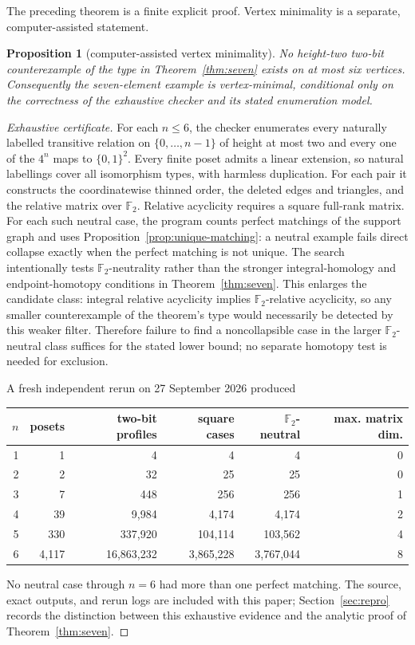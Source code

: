 \documentclass[11pt]{article}
\newtheorem{proposition}[theorem]{Proposition}
\theoremstyle{definition}
\theoremstyle{remark}
\newcommand{\Ftwo}{\mathbb F_2}
\begin{document}
The preceding theorem is a finite explicit proof.  Vertex minimality is a separate,
computer-assisted statement.

\begin{proposition}[computer-assisted vertex minimality]\label{prop:minimality}
No height-two two-bit counterexample of the type in Theorem~\ref{thm:seven} exists on
at most six vertices.  Consequently the seven-element example is vertex-minimal,
conditional only on the correctness of the exhaustive checker and its stated
enumeration model.
\end{proposition}

\begin{proof}[Exhaustive certificate]
For each $n\le6$, the checker enumerates every naturally labelled transitive relation
on $\{0,\ldots,n-1\}$ of height at most two and every one of the $4^n$ maps to
$\{0,1\}^2$.  Every finite poset admits a linear extension, so natural labellings cover
all isomorphism types, with harmless duplication.  For each pair it constructs the
coordinatewise thinned order, the deleted edges and triangles, and the relative
matrix over $\Ftwo$.  Relative acyclicity requires a square full-rank matrix.  For each
such neutral case, the program counts perfect matchings of the support graph and uses
Proposition~\ref{prop:unique-matching}: a neutral example fails direct collapse exactly
when the perfect matching is not unique.  The search intentionally tests
$\Ftwo$-neutrality rather than the stronger integral-homology and endpoint-homotopy
conditions in Theorem~\ref{thm:seven}.  This enlarges the candidate class: integral
relative acyclicity implies $\Ftwo$-relative acyclicity, so any smaller counterexample
of the theorem's type would necessarily be detected by this weaker filter.  Therefore
failure to find a noncollapsible case in the larger $\Ftwo$-neutral class suffices for
the stated lower bound; no separate homotopy test is needed for exclusion.

A fresh independent rerun on 27 September 2026 produced
\begin{center}
\small
\begin{tabular}{@{}rrrrrr@{}}
\toprule
$n$ & posets & two-bit profiles & square cases & $\Ftwo$-neutral & max. matrix dim. \\
\midrule
1&1&4&4&4&0\\
2&2&32&25&25&0\\
3&7&448&256&256&1\\
4&39&9,984&4,174&4,174&2\\
5&330&337,920&104,114&103,562&4\\
6&4,117&16,863,232&3,865,228&3,767,044&8\\
\bottomrule
\end{tabular}
\end{center}
No neutral case through $n=6$ had more than one perfect matching.  The source, exact
outputs, and rerun logs are included with this paper; Section~\ref{sec:repro} records
the distinction between this exhaustive evidence and the analytic proof of
Theorem~\ref{thm:seven}.
\end{proof}
\end{document}
